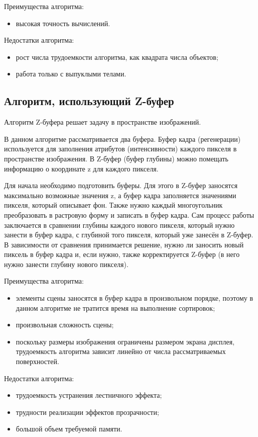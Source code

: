 Преимущества алгоритма:
\begin{itemize}
	\item высокая точность вычислений.
\end{itemize}

Недостатки алгоритма:
\begin{itemize}
	\item рост числа трудоемкости алгоритма, как квадрата числа объектов;
	\item работа только с выпуклыми телами.
\end{itemize}

\subsection{Алгоритм, использующий Z-буфер}

Алгоритм Z-буфера решает задачу в пространстве изображений. 

В данном алгоритме рассматривается два буфера. Буфер кадра (регенерации) используется для заполнения атрибутов (интенсивности) каждого пикселя в пространстве изображения. В Z-буфер (буфер глубины) можно помещать информацию о координате z для каждого пикселя.

Для начала необходимо подготовить буферы. Для этого в Z-буфер заносятся максимально возможные значения z, а буфер кадра заполняется значениями пикселя, который описывает фон. Также нужно каждый многоугольник преобразовать в растровую форму и записать в буфер кадра. Сам процесс работы заключается в сравнении глубины каждого нового пикселя, который нужно занести в буфер кадра,
с глубиной того пикселя, который уже занесён в Z-буфер. В зависимости от сравнения принимается решение, нужно ли заносить новый пиксель в буфер кадра и, если нужно, также корректируется Z-буфер (в него нужно занести глубину нового пикселя).

Преимущества алгоритма:
\begin{itemize}
	\item элементы сцены заносятся в буфер кадра в произвольном порядке, поэтому в данном алгоритме не тратится время на выполнение сортировок;
	\item произвольная сложность сцены;
	\item поскольку размеры изображения ограничены размером экрана дисплея, трудоемкость алгоритма зависит линейно от числа рассматриваемых поверхностей.
\end{itemize}

Недостатки алгоритма:
\begin{itemize}
	\item трудоемкость устранения лестничного эффекта;
	\item трудности реализации эффектов прозрачности;
	\item большой объем требуемой памяти.
\end{itemize}


